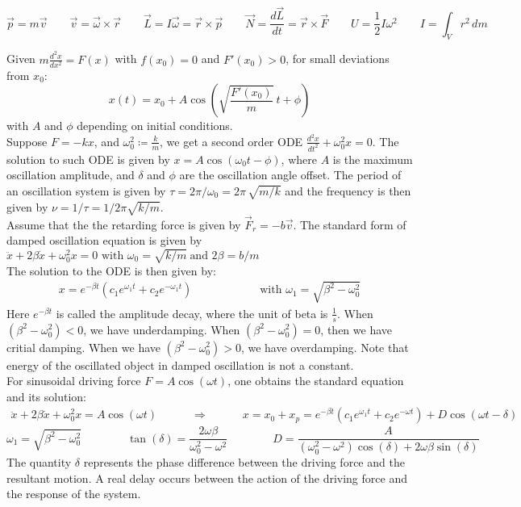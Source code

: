 \documentclass[11pt]{article}
\theoremstyle{break}
\theoremstyle{break}
\begin{document}
$$\vec{p} = m\vec{v}\qquad \vec{v} = \vec{\omega}\times \vec{r} \qquad \vec{L} = I\vec{\omega} = \vec{r}\times \vec{p}\qquad \vec{N} = \frac{d\vec{L}}{dt}=\vec{r}\times \vec{F}\qquad U = \frac{1}{2}I \omega^2 \qquad I = \int_V r^2\, dm$$

Given $m\frac{d^2x}{dx^2} = F(x)$ with $f(x_0) = 0$ and $F'(x_0) >0$, for small deviations from $x_0$: $$x(t) = x_0 + A\cos\left(\sqrt{\frac{F'(x_0)}{m}}\ t+ \phi\right)$$
with $A$ and $\phi$ depending on initial conditions.\\

Suppose $F = -kx$, and $\omega_0^2 \coloneqq \frac{k}{m}$, we get a second order ODE $\frac{d^2x}{dt^2}+\omega_0^2 x = 0$. The solution to such ODE is given by $x = A\cos(\omega_0 t-\phi)$, where $A$ is the maximum oscillation amplitude, and $\delta$ and $\phi$ are the oscillation angle offset. The period of an oscillation system is given by $\tau = {2\pi}/{\omega_0} = 2\pi \, \sqrt{{m}/{k}}$ and the frequency is then given by $\nu ={1}/{\tau} = {1}/{2\pi}\sqrt{{k}/{m}}$.\\

Assume that the the retarding force is given by $\vec{F}_r = -b\vec{v}$. The standard form of damped oscillation equation is given by $
\ddot{x}+2\beta\dot{x}+\omega_0^2x = 0 \text{ with }\omega_0 = \sqrt{k/m}\ \text{and }2\beta = b/m$\\
The solution to the ODE is then given by:
\begin{align*}
x = e^{-\beta t}(c_1e^{\omega_1 t} + c_2e^{-\omega_1 t}) \qquad\qquad\qquad\text{with }\omega_1 = \sqrt{\beta^2 - \omega_0^2}
\end{align*}
Here $e^{-\beta t}$ is called the amplitude decay, where the unit of beta is $\frac{1}{s}$. When $(\beta^2 - \omega_0^2)<0$, we have underdamping. When $(\beta^2-\omega_0^2) = 0$, then we have critial damping. When we have $(\beta^2 - \omega_0^2) >0$, we have overdamping. Note that energy of the oscillated object in damped oscillation is not a constant. \\

For sinusoidal driving force $F = A\cos(\omega t)$, one obtains the standard equation and its solution:
\begin{align*}
\ddot{x} + 2\beta \dot{x} + \omega_0^2 x = A\cos(\omega t)\qquad\quad\Rightarrow\qquad\quad
x = x_0 + x_p = e^{-\beta t} (c_1 e^{\omega_1 t} + c_2 e^{-\omega t} ) + D\cos(\omega t- \delta)
\end{align*}
$$\omega_1 = \sqrt{\beta^2 - \omega_0^2} \qquad\qquad \tan(\delta) = \frac{2\omega \beta}{\omega_0^2 - \omega^2}\qquad\qquad D = \frac{A}{(\omega_0^2 -\omega^2 ) \cos(\delta) +2 \omega\beta \sin(\delta)}$$
The quantity $\delta$ represents the phase difference between the driving force and the resultant motion. A real delay occurs between the action of the driving force and the response of the system.\\
\end{document}
